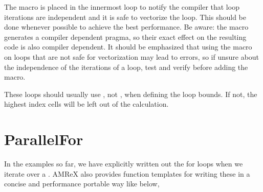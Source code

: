 \documentclass[letterpaper,10pt,english]{sphinxmanual}
\begin{document}
\sphinxAtStartPar
The  macro is placed in the innermost loop to notify
the compiler that loop iterations are independent and it is safe to
vectorize the loop.  This should be done whenever possible to achieve the
best performance. Be aware: the macro generates a compiler dependent
pragma, so their exact effect on the resulting code is also compiler
dependent.  It should be emphasized that using the 
macro on loops that are not safe for vectorization may lead to errors,
so if unsure about the independence of the iterations of a
loop, test and verify before adding the macro.

\sphinxAtStartPar
These loops should usually use , not , when
defining the loop bounds. If not, the highest index cells will be left out
of the calculation.


\section{ParallelFor}
\label{\detokenize{Basics:parallelfor}}\label{\detokenize{Basics:sec-basics-parallelfor}}
\sphinxAtStartPar
In the examples so far, we have explicitly written out the for loops
when we iterate over a .  AMReX also provides function
templates for writing these in a concise and performance portable way
like below,
\end{document}
